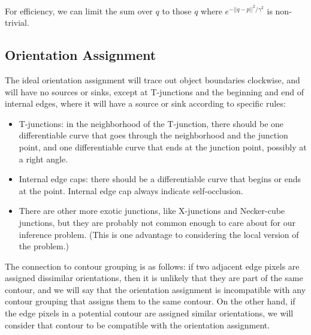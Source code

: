 For efficiency, we can limit the sum over $q$ to those $q$ where
$e^{-||q-p||^2/\gamma^2}$ is non-trivial.

\subsection{Orientation Assignment}

The ideal orientation assignment will trace out object boundaries
clockwise, and will have no sources or sinks, except at T-junctions
and the beginning and end of internal edges, where it will have a
source or sink according to specific rules:

\begin{itemize}
\item T-junctions: in the neighborhood of the T-junction, there should be
one differentiable curve that goes through the neighborhood and the
junction point, and one differentiable curve that ends at the junction
point, possibly at a right angle.

\item Internal edge caps: there should be a differentiable curve that begins
or ends at the point. Internal edge cap always indicate self-occlusion.

\item There are other more exotic junctions, like X-junctions and
Necker-cube junctions, but they are probably not common enough to care
about for our inference problem. (This is one advantage to considering
the local version of the problem.)
\end{itemize}

The connection to contour grouping is as follows: if two adjacent edge
pixels are assigned dissimilar orientations, then it is unlikely that
they are part of the same contour, and we will say that the
orientation assignment is incompatible with any contour grouping that
assigns them to the same contour. On the other hand, if the edge
pixels in a potential contour are assigned similar orientations, we will
consider that contour to be compatible with the orientation assignment. 

